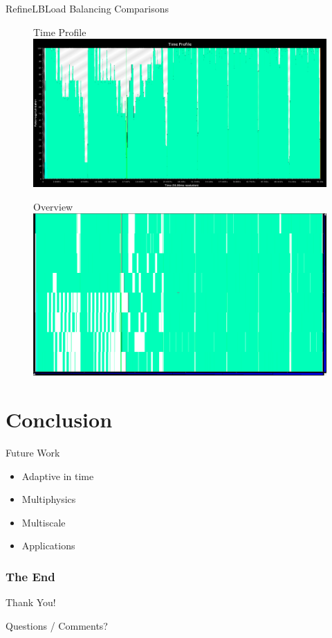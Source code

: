 \documentclass[]{beamer}
\begin{document}
\begin{frame}{RefineLB}{Load Balancing Comparisons}
  \begin{figure}{Time Profile}
    \includegraphics[width=.65\paperwidth,height=.35\paperheight]{figures/LoadBalancing/TimeProfileRefineLB}
  \end{figure}
  \begin{figure}{\hspace{15pt}Overview}
    \includegraphics[width=.65\paperwidth,height=.35\paperheight]{figures/LoadBalancing/OverviewRefineLB}
  \end{figure}
\end{frame}


\section{Conclusion}

\begin{frame}{Future Work}

  \begin{itemize}
  \item Adaptive in time
  \item Multiphysics
  \item Multiscale
  \item Applications
  \end{itemize}

\end{frame}


\begin{frame}
  \frametitle{The End}
  \begin{center}
    Thank You!

    Questions / Comments?
  \end{center}
\end{frame}
\end{document}

